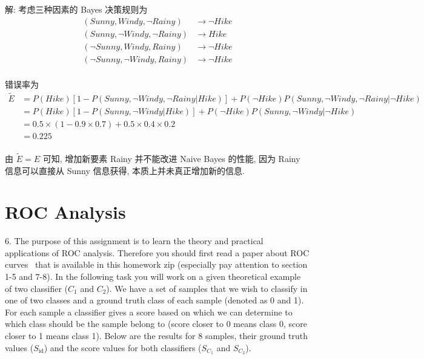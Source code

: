 \documentclass{article}
\begin{document}
解: 考虑三种因素的 Bayes 决策规则为
\begin{equation}
  \begin{aligned}
    (Sunny,Windy,\neg Rainy)&\to\neg Hike\\
    (Sunny,\neg Windy,\neg Rainy)&\to Hike\\
    (\neg Sunny,Windy,Rainy)&\to\neg Hike\\
    (\neg Sunny,\neg Windy,Rainy)&\to\neg Hike\\
  \end{aligned}
\end{equation}

错误率为
\begin{equation}
  \begin{aligned}
    \tilde{E}
    &=P(Hike)[1-P(Sunny,\neg Windy,\neg Rainy|Hike)]+P(\neg Hike)P(Sunny,\neg Windy,\neg Rainy|\neg Hike)\\
    &=P(Hike)[1-P(Sunny,\neg Windy|Hike)]+P(\neg Hike)P(Sunny,\neg Windy|\neg Hike)\\
    &=0.5\times(1-0.9\times0.7)+0.5\times0.4\times0.2\\
    &=0.225\\
  \end{aligned}
\end{equation}

由 $\tilde{E}=E$ 可知, 增加新要素 Rainy 并不能改进 Naive Bayes 的性能, 因为 Rainy 信息可以直接从 Sunny 信息获得, 本质上并未真正增加新的信息.

\section*{ROC Analysis}

6. The purpose of this assignment is to learn the theory and practical applications of ROC analysis. Therefore you should first read a paper about ROC curves~\cite{b1} that is available in this homework zip (especially pay attention to section 1-5 and 7-8). In the following task you will work on a given theoretical example of two classifier ($C_1$ and $C_2$). We have a set of samples that we wish to classify in one of two classes and a ground truth class of each sample (denoted as 0 and 1). For each sample a classifier gives a score based on which we can determine to which class should be the sample belong to (score closer to 0 means class 0, score closer to 1 means class 1). Below are the results for 8 samples, their ground truth values ($S_{\text{id}}$) and the score values for both classifiers ($S_{C_1}$ and $S_{C_2}$).
\end{document}
